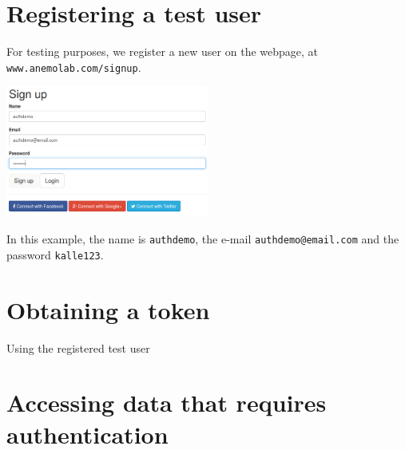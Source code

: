 \documentclass{article}
\begin{document}
\section{Registering a test user}
For testing purposes, we register a new user on the webpage, at \texttt{www.anemolab.com/signup}.
\begin{center}
\includegraphics[width=0.5\textwidth]{signup.png}
\end{center}

In this example, the name is \texttt{authdemo}, the e-mail \texttt{authdemo@email.com} and the password \texttt{kalle123}.
\section{Obtaining a token}
Using the registered test user
\section{Accessing data that requires authentication}
\end{document}
